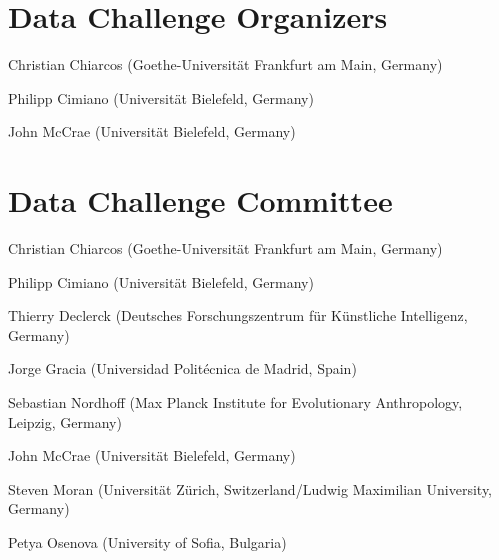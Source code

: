 \documentclass[10pt, a4paper]{article}
\begin{document}
\pagebreak
\begin{figure*}[t]
\begin{minipage}{\textwidth}


\section*{Data Challenge Organizers}

\smallskip

Christian Chiarcos (Goethe-Universität Frankfurt am Main, Germany)

Philipp Cimiano (Universität Bielefeld, Germany)

John McCrae (Universität Bielefeld, Germany)

\bigskip

\section*{Data Challenge Committee}

\smallskip

Christian Chiarcos (Goethe-Universität Frankfurt am Main, Germany)

Philipp Cimiano (Universität Bielefeld, Germany)

Thierry Declerck (Deutsches Forschungszentrum für Künstliche Intelligenz, Germany)

Jorge Gracia (Universidad Politécnica de Madrid, Spain)

Sebastian Nordhoff (Max Planck Institute for Evolutionary Anthropology, Leipzig, Germany)

John McCrae (Universität Bielefeld, Germany)
 
Steven Moran (Universität Zürich, Switzerland/Ludwig Maximilian University, Germany)
 
Petya Osenova (University of Sofia, Bulgaria)
 
\end{minipage}
\end{figure*}
\end{document}
